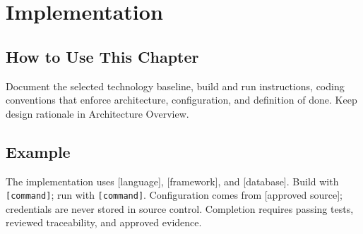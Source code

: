\chapter{Implementation}
\section{How to Use This Chapter}
Document the selected technology baseline, build and run instructions, coding conventions that enforce architecture, configuration, and definition of done. Keep design rationale in Architecture Overview.
\section{Example}
The implementation uses [language], [framework], and [database]. Build with \texttt{[command]}; run with \texttt{[command]}. Configuration comes from [approved source]; credentials are never stored in source control. Completion requires passing tests, reviewed traceability, and approved evidence.
